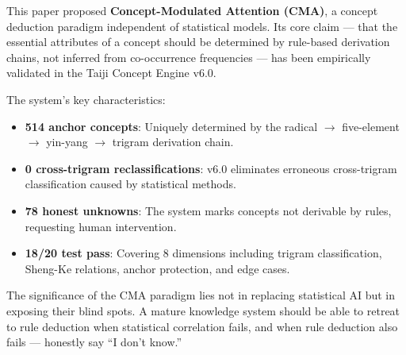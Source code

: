 \documentclass[11pt,a4paper]{article}
\begin{document}
This paper proposed \textbf{Concept-Modulated Attention (CMA)}, a concept deduction paradigm independent of statistical models. Its core claim — that the essential attributes of a concept should be determined by rule-based derivation chains, not inferred from co-occurrence frequencies — has been empirically validated in the Taiji Concept Engine v6.0.

The system's key characteristics:
\begin{itemize}
    \item \textbf{514 anchor concepts}: Uniquely determined by the radical $\rightarrow$ five-element $\rightarrow$ yin-yang $\rightarrow$ trigram derivation chain.
    \item \textbf{0 cross-trigram reclassifications}: v6.0 eliminates erroneous cross-trigram classification caused by statistical methods.
    \item \textbf{78 honest unknowns}: The system marks concepts not derivable by rules, requesting human intervention.
    \item \textbf{18/20 test pass}: Covering 8 dimensions including trigram classification, Sheng-Ke relations, anchor protection, and edge cases.
\end{itemize}

The significance of the CMA paradigm lies not in replacing statistical AI but in exposing their blind spots. A mature knowledge system should be able to retreat to rule deduction when statistical correlation fails, and when rule deduction also fails — honestly say ``I don't know.''

\end{document}
